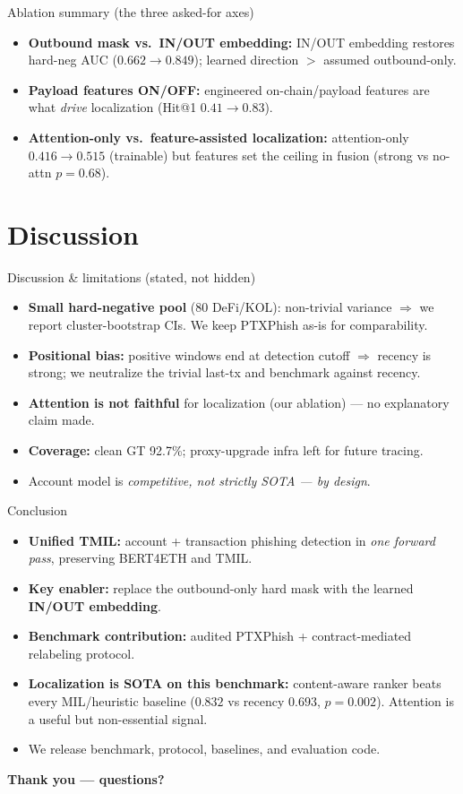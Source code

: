 \documentclass[aspectratio=169,10pt]{beamer}
\begin{document}
\begin{frame}{Ablation summary (the three asked-for axes)}
\begin{itemize}
\item \textbf{Outbound mask vs.\ IN/OUT embedding:} IN/OUT embedding restores hard-neg AUC ($0.662 \to 0.849$); learned direction $>$ assumed outbound-only.
\item \textbf{Payload features ON/OFF:} engineered on-chain/payload features are what \emph{drive} localization (Hit@1 $0.41 \to 0.83$).
\item \textbf{Attention-only vs.\ feature-assisted localization:} attention-only $0.416\!\to\!0.515$ (trainable) but features set the ceiling in fusion (strong vs no-attn $p{=}0.68$).
\end{itemize}
\end{frame}

\section{Discussion}
\begin{frame}{Discussion \& limitations (stated, not hidden)}
\begin{itemize}
\item \textbf{Small hard-negative pool} (80 DeFi/KOL): non-trivial variance $\Rightarrow$ we report cluster-bootstrap CIs. We keep PTXPhish as-is for comparability.
\item \textbf{Positional bias:} positive windows end at detection cutoff $\Rightarrow$ recency is strong; we neutralize the trivial last-tx and benchmark against recency.
\item \textbf{Attention is not faithful} for localization (our ablation) --- no explanatory claim made.
\item \textbf{Coverage:} clean GT 92.7\%; proxy-upgrade infra left for future tracing.
\item Account model is \emph{competitive, not strictly SOTA --- by design}.
\end{itemize}
\end{frame}

\begin{frame}{Conclusion}
\begin{itemize}
\item \textbf{Unified TMIL:} account + transaction phishing detection in \emph{one forward pass}, preserving BERT4ETH and TMIL.
\item \textbf{Key enabler:} replace the outbound-only hard mask with the learned \textbf{IN/OUT embedding}.
\item \textbf{Benchmark contribution:} audited PTXPhish + contract-mediated relabeling protocol.
\item \textbf{Localization is SOTA on this benchmark:} content-aware ranker beats every MIL/heuristic baseline ($0.832$ vs recency $0.693$, $p{=}0.002$). Attention is a useful but non-essential signal.
\item We release benchmark, protocol, baselines, and evaluation code.
\end{itemize}
\vfill
\centering\textbf{Thank you --- questions?}
\end{frame}
\end{document}
